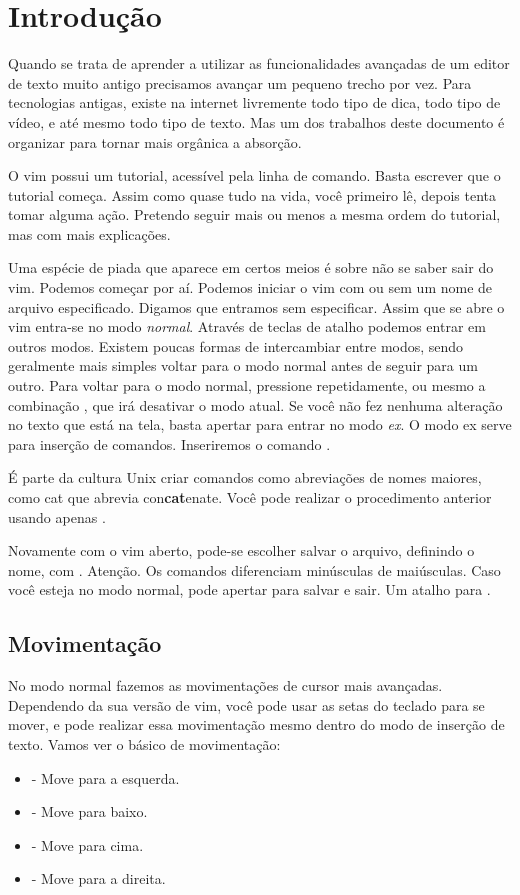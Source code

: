 \section{Introdução}
Quando se trata de aprender a utilizar as funcionalidades avançadas de um editor de texto muito
antigo precisamos avançar um pequeno trecho por vez.
Para tecnologias antigas, existe na internet livremente todo tipo de dica,
todo tipo de vídeo, e até mesmo todo tipo de texto.
Mas um dos trabalhos deste documento é organizar para tornar mais orgânica a absorção.

O vim possui um tutorial, acessível pela linha de comando.
Basta escrever  que o tutorial começa.
Assim como quase tudo na vida, você primeiro lê, depois tenta tomar alguma ação.
Pretendo seguir mais ou menos a mesma ordem do tutorial, mas com mais explicações.

Uma espécie de piada que aparece em certos meios é sobre não se saber sair do vim.
Podemos começar por aí.
Podemos iniciar o vim com ou sem um nome de arquivo especificado.
Digamos que entramos sem especificar.
Assim que se abre o vim entra-se no modo \emph{normal}.
Através de teclas de atalho podemos entrar em outros modos.
Existem poucas formas de intercambiar entre modos, sendo geralmente mais simples voltar
para o modo normal antes de seguir para um outro.
Para voltar para o modo normal, pressione  repetidamente,
ou mesmo a combinação , que irá desativar o modo atual.
Se você não fez nenhuma alteração no texto que está na tela, basta apertar \vimcommand{:} para entrar no modo \emph{ex}.
O modo ex serve para inserção de comandos.
Inseriremos o comando .

É parte da cultura Unix criar comandos como abreviações de nomes maiores,
como cat que abrevia con\textbf{cat}enate.
Você pode realizar o procedimento anterior usando apenas .

Novamente com o vim aberto, pode-se escolher salvar o arquivo, definindo o nome, com .
Atenção. Os comandos diferenciam minúsculas de maiúsculas.
Caso você esteja no modo normal, pode apertar  para salvar e sair. Um atalho para .

\subsection{Movimentação}
No modo normal fazemos as movimentações de cursor mais avançadas.
Dependendo da sua versão de vim, você pode usar as setas do teclado para se mover, e pode realizar essa movimentação mesmo dentro do modo de inserção de texto.
Vamos ver o básico de movimentação:
\begin{itemize}
    \item {} - Move para a esquerda.
    \item {} - Move para baixo.
    \item {} - Move para cima.
    \item {} - Move para a direita.
\end{itemize}
